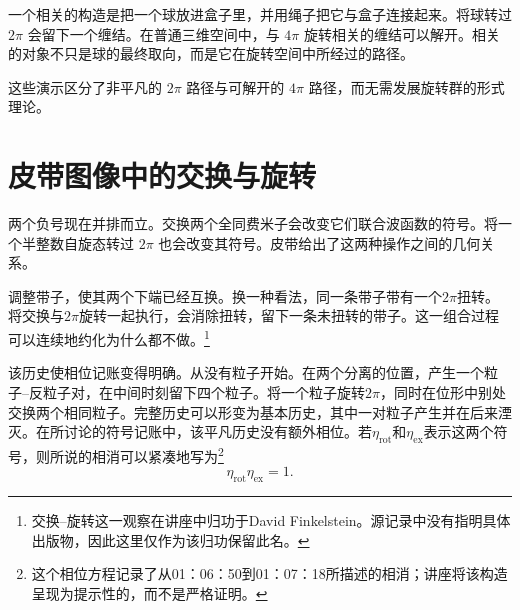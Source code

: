 一个相关的构造是把一个球放进盒子里，并用绳子把它与盒子连接起来。将球转过 \(2\pi\) 会留下一个缠结。在普通三维空间中，与 \(4\pi\) 旋转相关的缠结可以解开。相关的对象不只是球的最终取向，而是它在旋转空间中所经过的路径。

\begin{classroomqa}
\end{classroomqa}

这些演示区分了非平凡的 \(2\pi\) 路径与可解开的 \(4\pi\) 路径，而无需发展旋转群的形式理论。

\section{皮带图像中的交换与旋转}

两个负号现在并排而立。交换两个全同费米子会改变它们联合波函数的符号。将一个半整数自旋态转过 \(2\pi\) 也会改变其符号。皮带给出了这两种操作之间的几何关系。

调整带子，使其两个下端已经互换。换一种看法，同一条带子带有一个\(2\pi\)扭转。将交换与\(2\pi\)旋转一起执行，会消除扭转，留下一条未扭转的带子。这一组合过程可以连续地约化为什么都不做。\footnote{交换--旋转这一观察在讲座中归功于David Finkelstein。源记录中没有指明具体出版物，因此这里仅作为该归功保留此名。}

\begin{classroomqa}
\end{classroomqa}

该历史使相位记账变得明确。从没有粒子开始。在两个分离的位置，产生一个粒子--反粒子对，在中间时刻留下四个粒子。将一个粒子旋转\(2\pi\)，同时在位形中别处交换两个相同粒子。完整历史可以形变为基本历史，其中一对粒子产生并在后来湮灭。在所讨论的符号记账中，该平凡历史没有额外相位。若\(\eta_{\mathrm{rot}}\)和\(\eta_{\mathrm{ex}}\)表示这两个符号，则所说的相消可以紧凑地写为\footnote{这个相位方程记录了从01：06：50到01：07：18所描述的相消；讲座将该构造呈现为提示性的，而不是严格证明。}
\begin{equation}
\eta_{\mathrm{rot}}\eta_{\mathrm{ex}}=1.
\end{equation}

